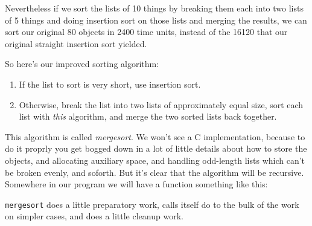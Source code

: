Nevertheless if we sort the lists of 10 things by breaking them each
into two lists of 5 things and doing insertion sort on those lists and
merging the results, we can sort our original 80 objects in 2400 time
units, instead of the 16120 that our original straight insertion sort
yielded. 

So here's our improved sorting algorithm:

\begin{enumerate}
\item If the list to sort is very short, use insertion sort.
\item Otherwise, break the list into two lists of approximately equal
size, sort each list with {\em this}\/ algorithm, and merge the two
sorted lists back together.
\end{enumerate}

This algorithm is called {\em mergesort}\/.  We won't see a C
implementation, because to do it proprly you get bogged down in a lot of
little details about how to store the objects, and allocating auxiliary
space, and handling odd-length lists which can't be broken evenly, and
soforth.  But it's clear that the algorithm will be recursive.
Somewhere in our program we will have a function something like this:

\begin{flushleft}
\verb% void mergesort(struct list *data, int length) % \\*
\verb% {% \\*
\verb%   ...% \\*
\verb%   if (length < SMALL_SIZE )  % \\*
\verb%     insertion_sort(data, length);% \\*
\verb%   else {% \\*
\verb%     split_list(data, top, bottom);% \\*
\verb%     mergesort(top,    length/2);% \\*
\verb%     mergesort(bottom, length/2);% \\*
\verb%     merge_lists(top, bottom, data);% \\*
\verb%     return;% \\*
\verb%   }% \\*
\verb% }% \\*
\end{flushleft}

{\tt mergesort} does a little preparatory work, calls itself do to the
bulk of the work on simpler cases, and does a little cleanup work.  


